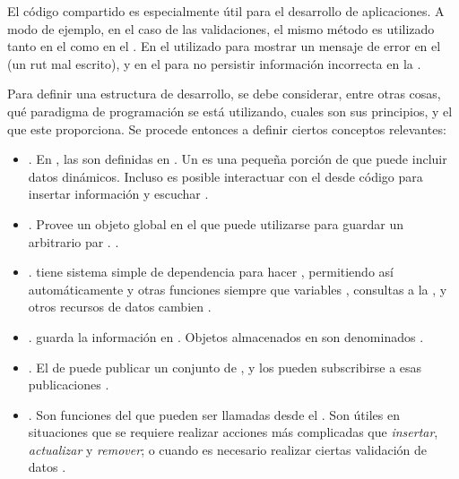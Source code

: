 

El código compartido es especialmente útil para el desarrollo de aplicaciones. A modo de ejemplo, en el caso de las validaciones, el mismo método es utilizado tanto en el \clientSideAS como en el \serverSideAS. En el \clientSideAS utilizado para mostrar un mensaje de error en el \browserINT (un rut mal escrito), y en el \serverSideAS para no persistir información incorrecta en la \dataBasesDB.

Para definir una estructura de desarrollo, se debe considerar, entre otras cosas, qué paradigma de programación se está utilizando, cuales son sus principios, y el \apiAS que este proporciona. Se procede entonces a definir ciertos conceptos relevantes:

	\begin{itemize}
		\item
			\textbf{\templatesMETEOR}. En \meteorNAME, las \viewsAS son definidas en \templatesMETEOR. Un \templateMETEOR es una pequeña porción de \htmlNAME que puede incluir datos dinámicos. Incluso es posible interactuar con el \templateMETEOR desde código \javaScriptNAME para insertar información y escuchar \events \cite{online_meteor_documentation}.
		\item
			\textbf{\sessionMETEOR}. Provee un objeto global en el \clientAS que puede utilizarse para guardar un arbitrario par \keyValueDB. \cite{online_meteor_documentation}.
		\item
			\textbf{\trackerMETEOR}. \meteorNAME tiene sistema simple de dependencia para hacer \trackingMETEOR, permitiendo así automáticamente \rerunCPT \templatesMETEOR y otras funciones siempre que variables \sessionMETEOR, consultas a la \dataBasesDB, y otros recursos de datos cambien \cite{online_meteor_documentation}.
		\item
			\textbf{\collectionsMETEOR}. \meteorNAME guarda la información en \collectionsMETEOR. Objetos \javaScriptNAME almacenados en \collectionsMETEOR son denominados \documentsDB \cite{online_meteor_documentation}.

		\item
			\textbf{\publishsubscribeMETEOR}. El \serverAS de \meteorNAME puede publicar un conjunto de \documentsDB , y los \clientsAS pueden subscribirse a esas publicaciones \cite{online_meteor_documentation}.
		\item
			\textbf{\methodsMETEOR}\label{cap:arquitectura:section:generic_architecture_structure:itemize:methods_meteor}. Son funciones del \serverSideAS que pueden ser llamadas desde el \clientSideAS. Son útiles en situaciones que se requiere realizar acciones más complicadas que \textit{insertar}, \textit{actualizar} y \textit{remover}; o cuando es necesario realizar ciertas validación de datos \cite{online_meteor_documentation}.
	\end{itemize}

